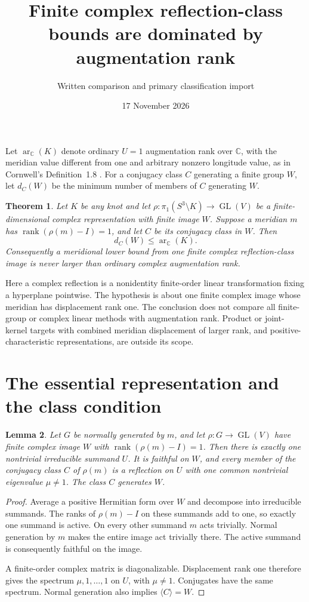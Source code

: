 \documentclass[11pt]{article}
\title{Finite complex reflection-class bounds are dominated by augmentation rank}
\author{Written comparison and primary classification import}
\date{17 November 2026}
\newtheorem{theorem}{Theorem}
\newtheorem{lemma}[theorem]{Lemma}
\newcommand{\C}{\mathbb C}
\newcommand{\GL}{\operatorname{GL}}
\newcommand{\ar}{\operatorname{ar}_{\C}}
\newcommand{\rank}{\operatorname{rank}}
\begin{document}
\maketitle

Let $\ar(K)$ denote ordinary $U=1$ augmentation rank over $\C$,
with the meridian value different from one and arbitrary nonzero
longitude value, as in Cornwell's Definition~1.8 \cite{cor17}.
For a conjugacy class $C$ generating a finite group $W$, let
$d_C(W)$ be the minimum number of members of $C$ generating $W$.

\begin{theorem}\label{thm:domination}
Let $K$ be any knot and let
$\rho:\pi_1(S^3\setminus K)\to\GL(V)$ be a finite-dimensional complex
representation with finite image $W$. Suppose a meridian $m$ has
$\rank(\rho(m)-I)=1$, and let $C$ be its conjugacy class in $W$.
Then
\[
                         d_C(W)\le \ar(K).
\]
Consequently a meridional lower bound from one finite complex
reflection-class image is never larger than ordinary complex
augmentation rank.
\end{theorem}

Here a complex reflection is a nonidentity finite-order linear
transformation fixing a hyperplane pointwise. The hypothesis is
about one finite complex image whose meridian has displacement rank
one. The conclusion does not compare all finite-group or complex
linear methods with augmentation rank. Product or joint-kernel
targets with combined meridian displacement of larger rank, and
positive-characteristic representations, are outside its scope.

\section{The essential representation and the class condition}

\begin{lemma}\label{lem:active}
Let $G$ be normally generated by $m$, and let
$\rho:G\to\GL(V)$ have finite complex image $W$ with
$\rank(\rho(m)-I)=1$. Then there is exactly one nontrivial
irreducible summand $U$. It is faithful on $W$, and every member of
the conjugacy class $C$ of $\rho(m)$ is a reflection on $U$ with one
common nontrivial eigenvalue $\mu\ne1$. The class $C$ generates $W$.
\end{lemma}
\begin{proof}
Average a positive Hermitian form over $W$ and decompose into
irreducible summands. The ranks of $\rho(m)-I$ on these summands
add to one, so exactly one summand is active. On every other
summand $m$ acts trivially. Normal generation by $m$ makes the
entire image act trivially there.
The active summand is consequently faithful on the image.

A finite-order complex matrix is diagonalizable. Displacement rank
one therefore gives the spectrum $\mu,1,\ldots,1$ on $U$, with
$\mu\ne1$. Conjugates have the same spectrum. Normal generation
also implies $\langle C\rangle=W$.
\end{proof}
\end{document}
